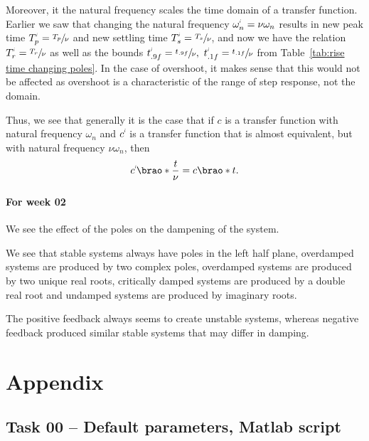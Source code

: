 \documentclass[12pt]{article}
\DeclarePairedDelimiter\brao()%
\newcommand{\setprime}[2][1]{%
    {#2}^{%
        \raisebox{1pt}{%
            \scalebox{0.5}{%
                \itshape\sffamily\uppercase%
                \expandafter{%
                    \romannumeral#1%
                }%
            }%
        }
    }%
}%
\begin{document}
Moreover, it the natural frequency
scales the time domain
of a transfer function.
Earlier we saw that changing the natural frequency $\setprime\omega_n = \nu\omega_n$ results in
new peak time $\setprime{T}_p = \sfrac{T_p}\nu$ and
new settling time $\setprime{T}_s = \sfrac{T_s}\nu$,
and now we have the relation $\setprime{T}_r = \sfrac{T_r}\nu$
as well as the bounds $\setprime{t}_{.9f} = \sfrac{t_{.9f}}\nu,\ \setprime{t}_{.1f} = \sfrac{t_{.1f}}\nu$
from Table~\ref{tab:rise time changing poles}.
In the case of overshoot, it makes sense that this would not be affected
as overshoot is a characteristic of the range of step response, not the domain.

Thus, we see that generally it is the case that if $c$ is a transfer function with natural frequency $\omega_n$
and $\setprime{c}$ is a transfer function that is almost equivalent, but with natural frequency $\nu\omega_n$,
then
\begin{equation}
    \setprime{c}\brao*{\frac{t}\nu} = c\brao*t.
\end{equation}

\paragraph{For week 02}

We see the effect of the poles on the dampening of the system.

We see that stable systems always have poles in the left half plane, overdamped systems are produced by two complex poles, overdamped systems are produced by two unique real roots, critically damped systems are produced by a double real root and undamped systems are produced by imaginary roots.

The positive feedback always seems to create unstable systems, whereas negative feedback produced similar stable systems that may differ in damping.

\newpage
\printbibliography

\newpage
\appendix
\section{Appendix}\label{app}

\subsection{Task 00 -- Default parameters, Matlab script}\label{sap:default params}
\inputminted{matlab}{src/lab08_task00_default_dc_motor_motor_params.m}
\end{document}
